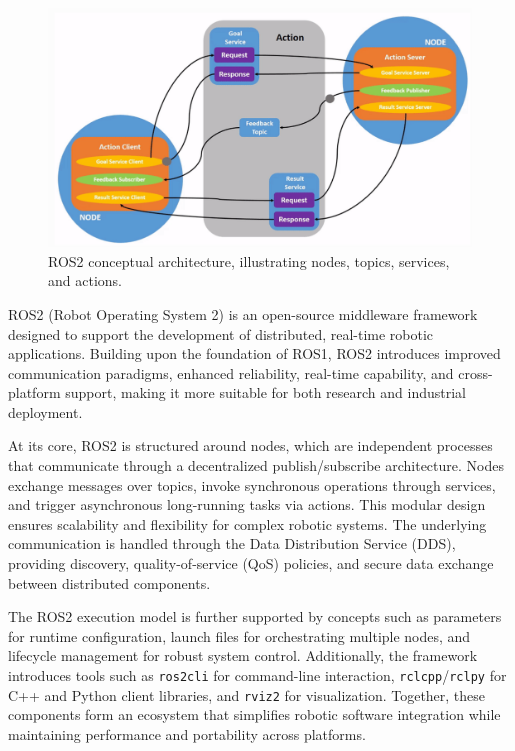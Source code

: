 \documentclass[12pt]{extarticle}
\begin{document}
\begin{figure}[htbp]
    \centering
    \includegraphics[width=\linewidth]{images/ros2_architecture.png}
    \caption{ROS2 conceptual architecture, illustrating nodes, topics, services, and actions.}
    \label{fig:ros2_architecture}
\end{figure}


ROS2 (Robot Operating System 2) is an open-source middleware framework designed to support the development of distributed, real-time robotic applications. Building upon the foundation of ROS1, ROS2 introduces improved communication paradigms, enhanced reliability, real-time capability, and cross-platform support, making it more suitable for both research and industrial deployment.

At its core, ROS2 is structured around nodes, which are independent processes that communicate through a decentralized publish/subscribe architecture. Nodes exchange messages over topics, invoke synchronous operations through services, and trigger asynchronous long-running tasks via actions. This modular design ensures scalability and flexibility for complex robotic systems. The underlying communication is handled through the Data Distribution Service (DDS), providing discovery, quality-of-service (QoS) policies, and secure data exchange between distributed components.

The ROS2 execution model is further supported by concepts such as parameters for runtime configuration, launch files for orchestrating multiple nodes, and lifecycle management for robust system control. Additionally, the framework introduces tools such as \texttt{ros2cli} for command-line interaction, \texttt{rclcpp}/\texttt{rclpy} for C++ and Python client libraries, and \texttt{rviz2} for visualization. Together, these components form an ecosystem that simplifies robotic software integration while maintaining performance and portability across platforms.
\end{document}
